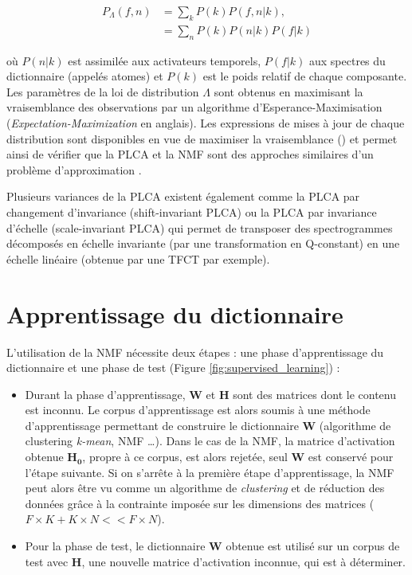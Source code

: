 \begin{align}
P_{\Lambda}\left(f,n\right) &= \sum_k P\left( k \right)P\left(f, n\vert k \right),\\
& = \sum_n P(k)P \left(n \vert k\right)P\left(f \vert k \right)
\end{align}

où $P\left( n \vert k \right)$ est assimilée aux activateurs temporels, $P\left(f \vert k \right)$ aux spectres du dictionnaire (appelés atomes) et $P\left(k \right)$ est le poids relatif de chaque composante. Les paramètres de la loi de distribution $\Lambda$ sont obtenus en maximisant la vraisemblance des observations par un algorithme d'{Esperance-Maximisation} (\textit{Expectation-Maximization} en anglais). Les expressions de mises à jour de chaque distribution sont disponibles en vue de maximiser la vraisemblance (\cite{shashanka_probabilistic_2008}) et permet ainsi de vérifier que la PLCA et la NMF sont des approches similaires d'un problème d'approximation \cite{gaussier_relation_2005}.

Plusieurs variances de la PLCA existent également comme la PLCA par changement d'invariance (shift-invariant PLCA) \cite{smaragdis_shift-invariant_2007} ou la PLCA par invariance d'échelle (scale-invariant PLCA) \cite{hennequin_scale-invariant_2011} qui permet de transposer des spectrogrammes décomposés en échelle invariante (par une transformation en Q-constant) en une échelle linéaire (obtenue par une TFCT par exemple).

\section{Apprentissage du dictionnaire}

L'utilisation de la NMF nécessite deux étapes : une phase d'apprentissage du dictionnaire et une phase de test (Figure \ref{fig:supervised_learning}) :

\begin{itemize}
\item Durant la phase d'apprentissage, $\mathbf{W}$ et $\mathbf{H}$ sont des matrices dont le contenu est inconnu. Le corpus d'apprentissage est alors soumis à une méthode d'apprentissage permettant de construire le dictionnaire $\mathbf{W}$ (algorithme de clustering \textit{k-mean}, NMF \dots). Dans le cas de la NMF, la matrice d'activation obtenue $\mathbf{H_0}$, propre à ce corpus, est alors rejetée, seul $\mathbf{W}$ est conservé pour l'étape suivante. Si on s'arrête à la première étape d'apprentissage, la NMF peut alors être vu comme un algorithme de \textit{clustering} \cite{li2006relationships} et de réduction des données grâce à la contrainte imposée sur les dimensions des matrices ($F \times K + K \times N << F \times N$).
\item Pour la phase de test, le dictionnaire $\mathbf{W}$ obtenue est utilisé sur un corpus de test avec $\mathbf{H}$, une nouvelle matrice d'activation inconnue, qui est à déterminer.
\end{itemize}

